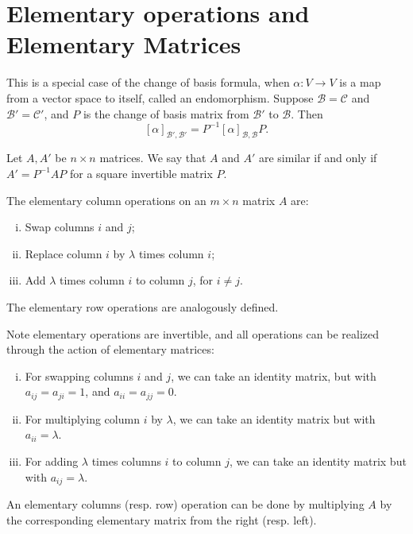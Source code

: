 \documentclass[12pt]{article}
\begin{document}
\newpage

\section{Elementary operations and Elementary Matrices}%
\label{sec:elementary_operations_and_elementary_matrices}

This is a special case of the change of basis formula, when $\alpha : V \to V$ is a map from a vector space to itself, called an endomorphism. Suppose $\mathcal{B} = \mathcal{C}$ and $\mathcal{B}' = \mathcal{C}'$, and $P$ is the change of basis matrix from $\mathcal{B}'$ to $\mathcal{B}$. Then
\[
	[\alpha]_{\mathcal{B'},  \mathcal{B}'} = P^{-1} [\alpha]_{\mathcal{B}, \mathcal{B}} P
.\]

\begin{definition}
	Let $A, A'$ be $n \times n$ matrices. We say that $A$ and $A'$ are similar if and only if $A' = P^{-1}AP$ for a square invertible matrix $P$.
\end{definition}

\begin{definition}
	The elementary column operations on an $m \times n$ matrix $A$ are:
	\begin{enumerate}[(i)]
		\item Swap columns $i$ and $j$;
		\item Replace column $i$ by $\lambda$ times column $i$;
		\item Add $\lambda$ times column $i$ to column $j$, for $i \neq j$.
	\end{enumerate}
	The elementary row operations are analogously defined.
\end{definition}

Note elementary operations are invertible, and all operations can be realized through the action of elementary matrices:
\begin{enumerate}[(i)]
	\item For swapping columns $i$ and $j$, we can take an identity matrix, but with $a_{ij} = a_{ji} = 1$, and $a_{ii} = a_{jj} = 0$.
	\item For multiplying column $i$ by $\lambda$, we can take an identity matrix but with $a_{ii} = \lambda$.
	\item For adding $\lambda$ times columns $i$ to column $j$, we can take an identity matrix but with $a_{ij} = \lambda$.
\end{enumerate}
An elementary columns (resp. row) operation can be done by multiplying $A$ by the corresponding elementary matrix from the right (resp. left).
\end{document}
